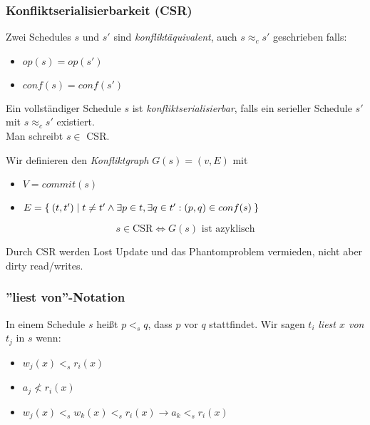 \documentclass[a4paper,parskip=half*,DIV=15,fontsize=11pt]{scrartcl}
\begin{document}
\subsubsection*{Konfliktserialisierbarkeit (CSR)}
\begin{minipage}[t]{0.45\textwidth}
Zwei Schedules $s$ und $s'$ sind \emph{konfliktäquivalent}, auch $s \approx_c s'$ geschrieben falls:
\begin{itemize}
\item $op(s) = op(s')$
\item $conf(s) = conf(s')$
\end{itemize}
\end{minipage}
\begin{minipage}[t]{0.1\textwidth}
\begin{center}

\end{center}
\end{minipage}
\begin{minipage}[t]{0.45\textwidth}
Ein vollständiger Schedule $s$ ist \emph{konfliktserialisierbar}, falls ein serieller Schedule $s'$ mit $s \approx_c s'$ existiert. \\
Man schreibt $s \in $ CSR.
\end{minipage}

Wir definieren den \emph{Konfliktgraph} $G(s)=(v,E)$ mit
\begin{itemize}
\item $V = commit(s)$
\item $E = \Set{(t,t')|t \neq t' \land \exists p \in t, \exists q \in t':(p,q) \in conf(s)}$
\end{itemize}
$$s \in \textrm{CSR} \Leftrightarrow G(s) \textrm{ ist azyklisch}$$

Durch CSR werden Lost Update und das Phantomproblem vermieden, nicht aber dirty read/writes.

\subsubsection*{''liest von''-Notation}

In einem Schedule $s$ heißt $p <_s q$, dass $p$ vor $q$ stattfindet. Wir sagen $t_i$ \emph{liest $x$ von} $t_j$ in $s$ wenn:
\begin{itemize}
\item $w_j(x) <_s r_i(x)$
\item $a_j \not < r_i(x)$
\item $w_j(x) <_s w_k(x) <_s r_i(x) \to a_k <_s r_i(x)$
\end{itemize}
\end{document}
